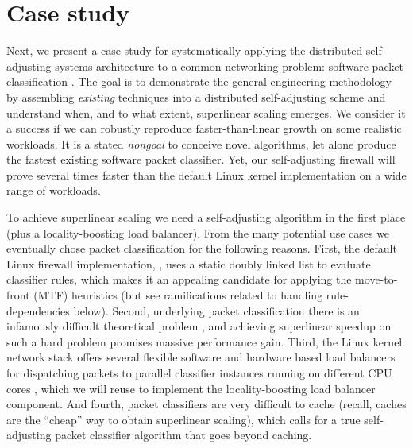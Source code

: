 \section{Case study }\label{sec:case-study}

Next, we present a case study for systematically applying the distributed self-adjusting systems architecture to a common networking problem: software packet classification \cite{gupta2001algorithms}. The goal is to demonstrate the general engineering methodology by assembling \emph{existing} techniques into a distributed self-adjusting scheme and understand when, and to what extent, superlinear scaling emerges. We consider it a success if we can robustly reproduce faster-than-linear growth on some realistic workloads. It is a stated \emph{nongoal} to conceive novel algorithms, let alone produce the fastest existing software packet classifier. %
Yet, our self-adjusting firewall will prove several times faster than the default Linux kernel implementation on a wide range of workloads.

To achieve superlinear scaling we need a self-adjusting algorithm in the first place (plus a locality-boosting load balancer). From the many potential use cases %
\cite{SleatorT85Splay, BentleyCL93, HesterH85, HesterH85, BentleySTW86, Avin0020, ParkM12} we eventually chose packet classification for the following reasons.  First, the default Linux firewall implementation, \nftables, uses a static doubly linked list to evaluate classifier rules, which makes it an appealing candidate for applying the move-to-front (MTF) heuristics (but see ramifications related to handling rule-dependencies below). %
Second, underlying packet classification there is an infamously difficult theoretical problem \cite{10.1145/2619239.2626294,10.1006/jagm.1996.0063, PacutVAPRS2022, 10.1145/2619239.2626294, 10.1145/1851182.1851208, 10.1145/863955.863980, gupta2001algorithms}, %
and achieving superlinear speedup on such a hard problem promises massive performance gain. Third, the Linux kernel network stack offers several flexible software and hardware based load balancers for dispatching packets to parallel classifier instances running on different CPU cores \cite{rss-linux}, which we will reuse to implement the locality-boosting load balancer component. And fourth, packet classifiers are very difficult to cache \cite{1354643} (recall, caches are the ``cheap'' way to obtain superlinear scaling), which calls for a true self-adjusting packet classifier algorithm that goes beyond caching. %

